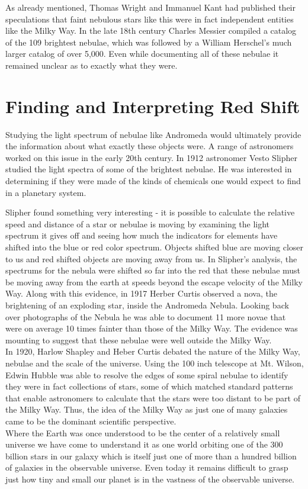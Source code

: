 \documentclass[16pt, a4 paper,two column]{article}
\begin{document}
As already mentioned, Thomas Wright and Immanuel Kant had published their speculations that faint nebulous stars like this were in fact independent entities like the Milky Way. In the late 18th century Charles Messier compiled a catalog of the 109 brightest nebulae, which was followed by a William Herschel's much larger catalog of over 5,000. Even while documenting all of these nebulae it remained unclear as to exactly what they were.
\section{Finding and Interpreting Red Shift}
Studying the light spectrum of nebulae like Andromeda would ultimately provide the information about what exactly these objects were. A range of astronomers worked on this issue in the early 20th century. In 1912 astronomer Vesto Slipher studied the light spectra of some of the brightest nebulae. He was interested in determining if they were made of the kinds of chemicals one would expect to find in a planetary system.

Slipher found something very interesting - it is possible to calculate the relative speed and distance of a star or nebulae is moving by examining the light spectrum it gives off and seeing how much the indicators for elements have shifted into the blue or red color spectrum. Objects shifted blue are moving closer to us and red shifted objects are moving away from us. In Slipher's analysis, the spectrums for the nebula were shifted so far into the red that these nebulae must be moving away from the earth at speeds beyond the escape velocity of the Milky Way. Along with this evidence, in 1917 Herber Curtis observed a nova, the brightening of an exploding star, inside the Andromeda Nebula. Looking back over photographs of the Nebula he was able to document 11 more novae that were on average 10 times fainter than those of the Milky Way. The evidence was mounting to suggest that these nebulae were well outside the Milky Way.\\

In 1920, Harlow Shapley and Heber Curtis debated the nature of the Milky Way, nebulae and the scale of the universe. Using the 100 inch telescope at Mt. Wilson, Edwin Hubble was able to resolve the edges of some spiral nebulae to identify they were in fact collections of stars, some of which matched standard patterns that enable astronomers to calculate that the stars were too distant to be part of the Milky Way.  Thus, the idea of the Milky Way as just one of many galaxies came to be the dominant scientific perspective.\\

Where the Earth was once understood to be the center of a relatively small universe we have come to understand it as one world orbiting one of the 300 billion stars in our galaxy which is itself just one of more than a hundred billion of galaxies in the observable universe. Even today it remains difficult to grasp just how tiny and small our planet is in the vastness of the observable universe.
\end{document}
